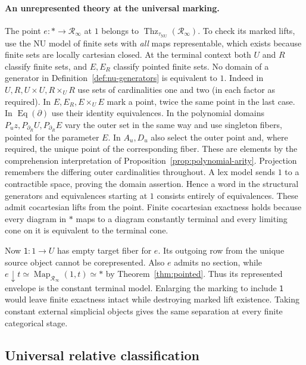 \documentclass[oneside]{article}
\theoremstyle{plain}
\theoremstyle{definition}
\theoremstyle{remark}
\newcommand{\Eq}{\operatorname{Eq}}
\newcommand{\Map}{\operatorname{Map}}
\newcommand{\NU}{\mathrm{NU}}
\newcommand{\RNU}{\mathcal R_{\infty}}
\newcommand{\Thz}{\operatorname{Thz}}
\begin{document}
\paragraph{An unrepresented theory at the universal marking.}
The point $e:*\to\RNU$ at $1$ belongs to $\Thz_{\tau_{\NU}}(\RNU)$.
To check its marked lifts, use the NU model of finite sets with
\emph{all} maps representable, which exists because finite sets are
locally cartesian closed. At the terminal context both $U$ and $R$
classify finite sets, and $E,E_R$ classify pointed finite sets.
No domain of a generator in Definition~\ref{def:nu-generators} is
equivalent to $1$. Indeed in $U,R,U\times U,R\times_U R$ use sets
of cardinalities one and two (in each factor as required).
In $E,E_R,E\times_U E$ mark a point, twice the same point in the last
case. In $\Eq(\partial)$ use their identity equivalences. In the
polynomial domains $P_u z,P_{\partial_R}U,P_{\partial_R}E$ vary the
outer set in the same way and use singleton fibers, pointed for the
parameter $E$. In $A_u,D_u$ also select the outer point and, where
required, the unique point of the corresponding fiber. These are
elements by the comprehension interpretation of
Proposition~\ref{prop:polynomial-arity}. Projection remembers
the differing outer cardinalities throughout. A lex model sends $1$
to a contractible space, proving the domain assertion. Hence a word
in the structural generators and equivalences starting at $1$ consists
entirely of equivalences. These admit cocartesian lifts from the point.
Finite cocartesian exactness holds because every diagram in $*$ maps
to a diagram constantly terminal and every limiting cone on it is
equivalent to the terminal cone.

Now $\mathsf1:1\to U$ has empty target fiber for $e$. Its outgoing
row from the unique source object cannot be corepresented. Also $e$
admits no section, while $e\downarrow t\simeq\Map_{\RNU}(1,t)\simeq *$
by Theorem~\ref{thm:pointed}. Thus its represented envelope is the constant terminal model.
Enlarging the marking to include $\mathsf1$ would leave finite exactness
intact while destroying marked lift existence. Taking constant external simplicial objects
gives the same separation at every finite categorical stage.

\subsection{Universal relative classification}
\end{document}
